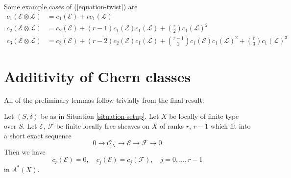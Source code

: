 \noindent
Some example cases of (\ref{equation-twist}) are
\begin{align*}
c_1(\mathcal{E} \otimes \mathcal{L})
& =
c_1(\mathcal{E}) +
r c_1(\mathcal{L}) \\
c_2(\mathcal{E} \otimes \mathcal{L})
& =
c_2(\mathcal{E}) +
(r - 1) c_1(\mathcal{E}) c_1(\mathcal{L}) +
\binom{r}{2} c_1(\mathcal{L})^2 \\
c_3(\mathcal{E} \otimes \mathcal{L})
& =
c_3(\mathcal{E}) +
(r - 2) c_2(\mathcal{E})c_1(\mathcal{L}) +
\binom{r - 1}{2} c_1(\mathcal{E})c_1(\mathcal{L})^2 +
\binom{r}{3} c_1(\mathcal{L})^3
\end{align*}








\section{Additivity of Chern classes}
\label{section-additivity-chern-classes}

\noindent
All of the preliminary lemmas follow trivially from the
final result.

\begin{lemma}
\label{lemma-get-rid-of-trivial-subbundle}
Let $(S, \delta)$ be as in Situation \ref{situation-setup}.
Let $X$ be locally of finite type over $S$.
Let $\mathcal{E}$, $\mathcal{F}$ be finite locally free sheaves
on $X$ of ranks $r$, $r - 1$ which fit into a short
exact sequence
$$
0 \to \mathcal{O}_X \to \mathcal{E} \to \mathcal{F} \to 0
$$
Then we have
$$
c_r(\mathcal{E}) = 0, \quad
c_j(\mathcal{E}) = c_j(\mathcal{F}), \quad j = 0, \ldots, r - 1
$$
in $A^*(X)$.
\end{lemma}

